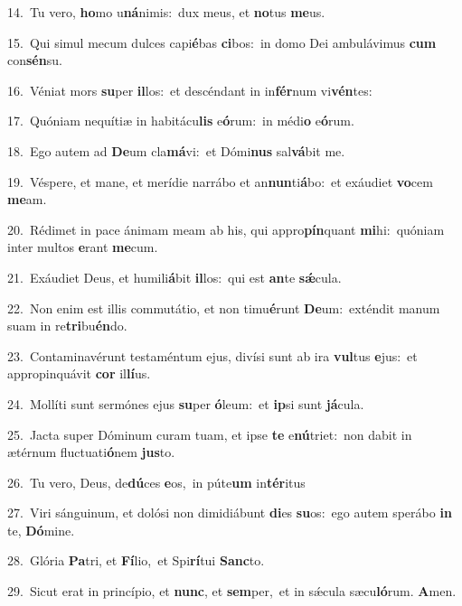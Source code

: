 {\numbfont\textcolor{\numbcolor}{14.}}~Tu vero, \textbf{ho}\-mo u\-\textbf{ná}\-nimis:~\star dux meus, et \textbf{no}\-tus \textbf{me}\-us.\par
{\numbfont\textcolor{\numbcolor}{15.}}~Qui simul mecum dulces capi\-\textbf{é}\-bas \textbf{ci}\-bos:~\star in domo Dei ambulávimus \textbf{cum} con\-\textbf{sén}\-su.\par
{\numbfont\textcolor{\numbcolor}{16.}}~Véniat mors \textbf{su}\-per \textbf{il}\-los:~\star et descéndant in in\-\textbf{fér}\-num vi\-\textbf{vén}\-tes:\par
{\numbfont\textcolor{\numbcolor}{17.}}~Quóniam nequítiæ in habitácu\textbf{lis} e\-\textbf{ó}\-rum:~\star in médi\textbf{o} e\-\textbf{ó}\-rum.\par
{\numbfont\textcolor{\numbcolor}{18.}}~Ego autem ad \textbf{De}\-um cla\-\textbf{má}\-vi:~\star et Dómi\textbf{nus} sal\-\textbf{vá}\-bit me.\par
{\numbfont\textcolor{\numbcolor}{19.}}~Véspere, et mane, et merídie narrábo et an\-\textbf{nun}\-ti\-\textbf{á}\-bo:~\star et exáudiet \textbf{vo}\-cem \textbf{me}\-am.\par
{\numbfont\textcolor{\numbcolor}{20.}}~Rédimet in pace ánimam meam ab his, qui appro\-\textbf{pín}\-quant \textbf{mi}\-hi:~\star quóniam inter multos \textbf{e}\-rant \textbf{me}\-cum.\par
{\numbfont\textcolor{\numbcolor}{21.}}~Exáudiet Deus, et humili\-\textbf{á}\-bit \textbf{il}\-los:~\star qui est \textbf{an}\-te \textbf{sǽ}\-cula.\par
{\numbfont\textcolor{\numbcolor}{22.}}~Non enim est illis commutátio, et non timu\-\textbf{é}\-runt \textbf{De}\-um:~\star exténdit manum suam in re\-\textbf{tri}\-bu\-\textbf{én}\-do.\par
{\numbfont\textcolor{\numbcolor}{23.}}~Contaminavérunt testaméntum ejus, divísi sunt ab ira \textbf{vul}\-tus \textbf{e}\-jus:~\star et appropinquávit \textbf{cor} il\-\textbf{lí}\-us.\par
{\numbfont\textcolor{\numbcolor}{24.}}~Mollíti sunt sermónes ejus \textbf{su}\-per \textbf{ó}\-leum:~\star et \textbf{ip}\-si sunt \textbf{já}\-cula.\par
{\numbfont\textcolor{\numbcolor}{25.}}~Jacta super Dóminum curam tuam, et ipse \textbf{te} e\-\textbf{nú}\-triet:~\star non dabit in ætérnum fluctuati\-\textbf{ó}\-nem \textbf{jus}\-to.\par
{\numbfont\textcolor{\numbcolor}{26.}}~Tu vero, Deus, de\-\textbf{dú}\-ces \textbf{e}\-os,~\star in púte\textbf{um} in\-\textbf{tér}\-itus\par
{\numbfont\textcolor{\numbcolor}{27.}}~Viri sánguinum, et dolósi non dimidiábunt \textbf{di}\-es \textbf{su}\-os:~\star ego autem sperábo \textbf{in} te, \textbf{Dó}\-mine.\par
{\numbfont\textcolor{\numbcolor}{28.}}~Glória \textbf{Pa}\-tri, et \textbf{Fí}\-lio,~\star et Spi\-\textbf{rí}\-tui \textbf{Sanc}\-to.\par
{\numbfont\textcolor{\numbcolor}{29.}}~Sicut erat in princípio, et \textbf{nunc}\-, et \textbf{sem}\-per,~\star et in sǽcula sæcu\-\textbf{ló}\-rum. \textbf{A}\-men.\par
